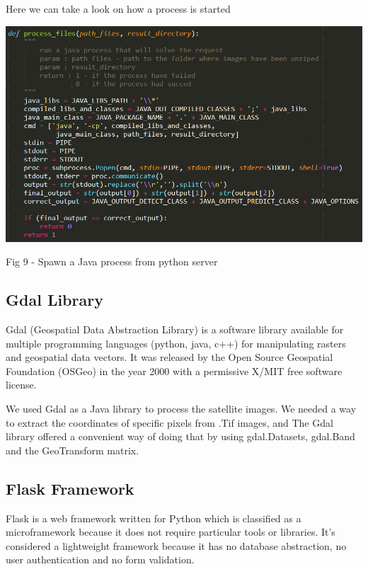 \documentclass[12pt, a4paper]{report}
\begin{document}
\newpage

Here we can take a look on how a process is started
\par
\medskip
\includegraphics[scale=0.7, center]{python_call_java_2.png}
\begin{center}
Fig 9 - Spawn a Java process from python server
\end{center}

\subsection{Gdal Library}

\quad
Gdal (Geospatial Data Abstraction Library) is a software library available for multiple programming languages (python, java, c++) for manipulating rasters and geospatial data vectors. It was released by the Open Source Geospatial Foundation (OSGeo) in the year 2000 with a permissive X/MIT free software license\cite{Gdal}. 
\par 

We used Gdal as a Java library to process the satellite images. We needed a way to extract the coordinates of specific pixels from .Tif images, and The Gdal library offered a convenient way of doing that by using gdal.Datasets, gdal.Band and the GeoTransform matrix.

\subsection{Flask Framework}

\quad
Flask is a web framework written for Python which is classified as a microframework because it does not require particular tools or libraries. It's considered a lightweight framework because it has no database abstraction, no user authentication and no form validation.
\par 
\end{document}
